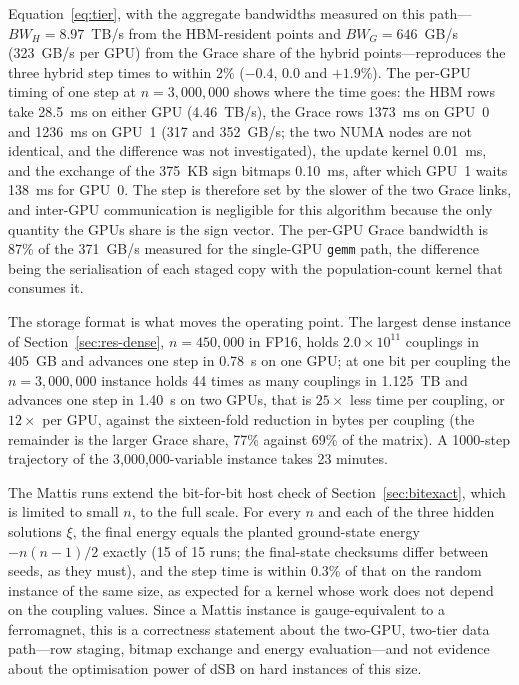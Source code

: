 \documentclass[11pt,a4paper]{article}
\newcommand{\code}[1]{\texttt{#1}}
\begin{document}
Equation~\eqref{eq:tier}, with the aggregate bandwidths measured on this path---$BW_H=8.97$~TB/s from the HBM-resident points and $BW_G=646$~GB/s (323~GB/s per GPU) from the Grace share of the hybrid points---reproduces the three hybrid step times to within 2\% ($-0.4$, $0.0$ and $+1.9$\%). The per-GPU timing of one step at $n=3{,}000{,}000$ shows where the time goes: the HBM rows take 28.5~ms on either GPU (4.46~TB/s), the Grace rows 1373~ms on GPU~0 and 1236~ms on GPU~1 (317 and 352~GB/s; the two NUMA nodes are not identical, and the difference was not investigated), the update kernel 0.01~ms, and the exchange of the 375~KB sign bitmaps 0.10~ms, after which GPU~1 waits 138~ms for GPU~0. The step is therefore set by the slower of the two Grace links, and inter-GPU communication is negligible for this algorithm because the only quantity the GPUs share is the sign vector. The per-GPU Grace bandwidth is 87\% of the 371~GB/s measured for the single-GPU \code{gemm} path, the difference being the serialisation of each staged copy with the population-count kernel that consumes it.

The storage format is what moves the operating point. The largest dense instance of Section~\ref{sec:res-dense}, $n=450{,}000$ in FP16, holds $2.0\times10^{11}$ couplings in 405~GB and advances one step in 0.78~s on one GPU; at one bit per coupling the $n=3{,}000{,}000$ instance holds 44 times as many couplings in 1.125~TB and advances one step in 1.40~s on two GPUs, that is $25\times$ less time per coupling, or $12\times$ per GPU, against the sixteen-fold reduction in bytes per coupling (the remainder is the larger Grace share, 77\% against 69\% of the matrix). A 1000-step trajectory of the 3,000,000-variable instance takes 23 minutes.

The Mattis runs extend the bit-for-bit host check of Section~\ref{sec:bitexact}, which is limited to small $n$, to the full scale. For every $n$ and each of the three hidden solutions $\xi$, the final energy equals the planted ground-state energy $-n(n-1)/2$ exactly (15 of 15 runs; the final-state checksums differ between seeds, as they must), and the step time is within 0.3\% of that on the random instance of the same size, as expected for a kernel whose work does not depend on the coupling values. Since a Mattis instance is gauge-equivalent to a ferromagnet, this is a correctness statement about the two-GPU, two-tier data path---row staging, bitmap exchange and energy evaluation---and not evidence about the optimisation power of dSB on hard instances of this size.
\end{document}
